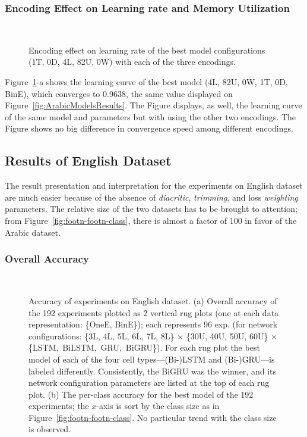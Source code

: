 \subsubsection{Encoding Effect on Learning rate and Memory
  Utilization}\label{sec:learning-rate-memory}
\begin{figure}[!tb]
  \centering
  \begin{tikzpicture}[scale=0.85]
    
  \end{tikzpicture}
  \caption{Encoding effect on learning rate of the best model configurations (1T, 0D, 4L, 82U, 0W)
    with each of the three encodings.}~\label{fig:ConvergenceMemory}
\end{figure}
Figure~\ref{fig:ConvergenceMemory}-a shows the learning curve of the best model (4L, 82U, 0W, 1T,
0D, BinE), which converges to 0.9638, the same value displayed on
Figure~\ref{fig:ArabicModelsResults}. The Figure displays, as well, the learning curve of the same
model and parameters but with using the other two encodings. The Figure shows no big difference in
convergence speed among different encodings.


\subsection{Results of English Dataset}\label{sec:english-results}
The result presentation and interpretation for the experiments on English dataset are much easier
because of the absence of \textit{diacritic}, \textit{trimming}, and loss \textit{weighting}
parameters. The relative size of the two datasets has to be brought to attention; from
Figure~\ref{fig:footn-footn-class}, there is almost a factor of 100 in favor of the Arabic dataset.

\bigskip

\subsubsection{Overall Accuracy}\label{sec:overall-accuracy}
\begin{figure}[!tb]
  \centering
  \begin{tikzpicture}[scale=0.8]
    
    
  \end{tikzpicture}
  \caption{Accuracy of experiments on English dataset. (a) Overall accuracy of the 192
    experiments plotted as 2 vertical rug plots (one at each data representation: \{OneE, BinE\});
    each represents 96 exp. (for network configurations: \{3L, 4L, 5L, 6L, 7L, 8L\} $\times$ \{30U,
    40U, 50U, 60U\} $\times$ \{LSTM,\ BiLSTM,\ GRU,\ BiGRU\}). For each rug plot the best model of each
    of the four cell types---(Bi-)LSTM and (Bi-)GRU---is labeled differently. Consistently, the BiGRU
    was the winner, and its network configuration parameters are listed at the top of each rug
    plot. (b) The per-class accuracy for the best model of the 192 experiments; the $x$-axis is
    sort by the class size as in Figure~\ref{fig:footn-footn-class}. No particular trend with the
    class size is observed.}~\label{english_results}
\end{figure}

